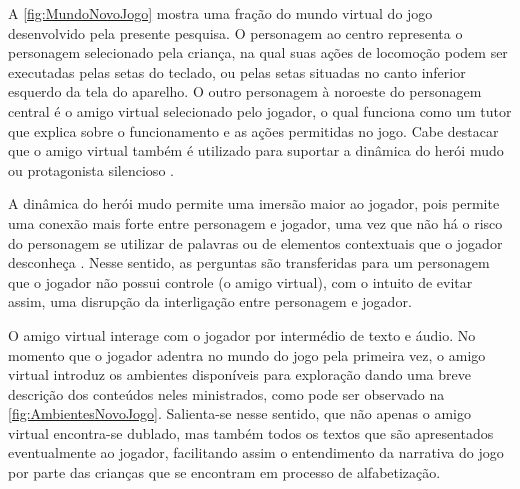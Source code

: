 \documentclass[alpha-refs,brazilian]{RBCA_v2.0}
\begin{document}
A \cref{fig:MundoNovoJogo} mostra uma fração do mundo virtual do jogo desenvolvido pela presente pesquisa. O personagem ao centro representa o personagem selecionado pela criança, na qual suas ações de locomoção podem ser executadas pelas setas do teclado, ou pelas setas situadas no canto inferior esquerdo da tela do aparelho. O outro personagem à noroeste do personagem central é o amigo virtual selecionado pelo jogador, o qual funciona como um tutor que explica sobre o funcionamento e as ações permitidas no jogo. Cabe destacar que o amigo virtual também é utilizado para suportar a dinâmica do herói mudo ou protagonista silencioso \citep{domsch2017dialogue}. 

A dinâmica do herói mudo permite uma imersão maior ao jogador, pois permite uma conexão mais forte entre personagem e jogador, uma vez que não há o risco do personagem se utilizar de palavras ou de elementos contextuais que o jogador desconheça \citep{domsch2017dialogue}. Nesse sentido, as perguntas são transferidas para um personagem que o jogador não possui controle (o amigo virtual), com o intuito de evitar assim, uma disrupção da interligação entre personagem e jogador.

O amigo virtual interage com o jogador por intermédio de texto e áudio. No momento que o jogador adentra no mundo do jogo pela primeira vez, o amigo virtual introduz os ambientes disponíveis para exploração dando uma breve descrição dos conteúdos neles ministrados, como pode ser observado na \cref{fig:AmbientesNovoJogo}. Salienta-se nesse sentido, que não apenas o amigo virtual encontra-se dublado, mas também todos os textos que são apresentados eventualmente ao jogador, facilitando assim o entendimento da narrativa do jogo por parte das crianças que se encontram em processo de alfabetização.

\newpage
\end{document}

